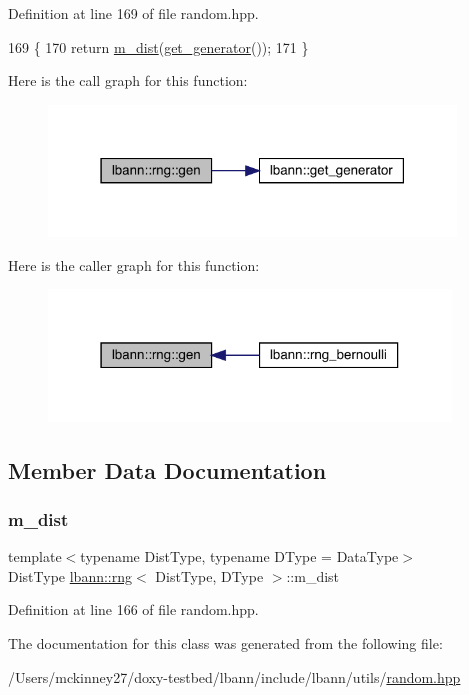 Definition at line 169 of file random.\+hpp.


\begin{DoxyCode}
169                                      \{
170     \textcolor{keywordflow}{return} \hyperlink{classlbann_1_1rng_a07a437f5344e29d6cf557e95ae83a24c}{m\_dist}(\hyperlink{namespacelbann_a4fea7ba21017b49d1e34394b4c20c764}{get\_generator}());
171   \}
\end{DoxyCode}
Here is the call graph for this function\+:\nopagebreak
\begin{figure}[H]
\begin{center}
\leavevmode
\includegraphics[width=307pt]{classlbann_1_1rng_a1c8a2640dd522c6fc63bf2de09ff3e84_cgraph}
\end{center}
\end{figure}
Here is the caller graph for this function\+:\nopagebreak
\begin{figure}[H]
\begin{center}
\leavevmode
\includegraphics[width=303pt]{classlbann_1_1rng_a1c8a2640dd522c6fc63bf2de09ff3e84_icgraph}
\end{center}
\end{figure}


\subsection{Member Data Documentation}
\mbox{\label{classlbann_1_1rng_a07a437f5344e29d6cf557e95ae83a24c}} 
\subsubsection{\texorpdfstring{m\+\_\+dist}{m\_dist}}
{\footnotesize\ttfamily template$<$typename Dist\+Type, typename D\+Type = Data\+Type$>$ \\
Dist\+Type \hyperlink{classlbann_1_1rng}{lbann\+::rng}$<$ Dist\+Type, D\+Type $>$\+::m\+\_\+dist\hspace{0.3cm}{\ttfamily [private]}}



Definition at line 166 of file random.\+hpp.



The documentation for this class was generated from the following file\+:\begin{DoxyCompactItemize}
\item 
/\+Users/mckinney27/doxy-\/testbed/lbann/include/lbann/utils/\hyperlink{random_8hpp}{random.\+hpp}\end{DoxyCompactItemize}
